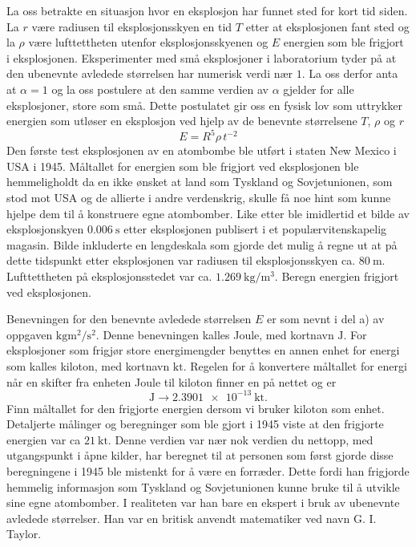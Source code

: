 \documentclass[a4paper,11pt]{article}
\begin{document}
    \begin{subproblem}
        La oss betrakte en situasjon hvor en eksplosjon har funnet sted for
        kort tid siden. La $r$ være radiusen til eksplosjonsskyen en tid $T$
        etter at eksplosjonen fant sted og la $\rho$ være lufttettheten utenfor
        eksplosjonsskyenen og $E$ energien som ble frigjort i eksplosjonen.
        Eksperimenter med små eksplosjoner i laboratorium tyder på at den
        ubenevnte avledede størrelsen har numerisk verdi nær $1$. La oss derfor
        anta at $\alpha=1$ og la oss postulere at den samme verdien av $\alpha$
        gjelder for alle eksplosjoner, store som små. Dette postulatet gir oss
        en fysisk lov som uttrykker energien som utløser en eksplosjon ved hjelp
        av de benevnte størrelsene $T$, $\rho$ og $r$
        \begin{equation*}
          E = R^{5} \rho\,t^{-2}
        \end{equation*}
        Den første test eksplosjonen av en atombombe ble utført i staten New
        Mexico i USA i 1945. Måltallet for energien som ble frigjort ved
        eksplosjonen ble hemmeligholdt da en ikke ønsket at land som Tyskland og
        Sovjetunionen, som stod mot USA og de allierte i andre verdenskrig,
        skulle få noe hint som kunne hjelpe dem til å konstruere egne
        atombomber. Like etter ble imidlertid et bilde av eksplosjonskyen
        $\SI{0.006}{\s}$ etter eksplosjonen publisert i et populærvitenskapelig
        magasin. Bilde inkluderte en lengdeskala som gjorde det mulig å regne ut
        at på dette tidspunkt etter eksplosjonen var radiusen til
        eksplosjonsskyen ca. $\SI{80}{\m}$. Lufttettheten på eksplosjonsstedet
        var ca.  $\SI{1.269}{\kg\per\m\cubed}$. Beregn energien frigjort ved
        eksplosjonen.

        Benevningen for den benevnte avledede størrelsen $E$ er som
        nevnt i del a) av oppgaven $\si{\kg\m\squared\per\s\squared}$. Denne
        benevningen kalles Joule, med kortnavn $\si{\joule}$. For eksplosjoner
        som frigjør store energimengder benyttes en annen enhet for energi som
        kalles kiloton, med kortnavn $\si{\kilo\tonne}$. Regelen for å
        konvertere måltallet for energi når en skifter fra enheten Joule til
        kiloton finner en på nettet og er
        \begin{equation*}
          \si{\joule} \rightarrow \SI{2.3901e-13}{\kilo\tonne}.
        \end{equation*}
        Finn måltallet for den frigjorte energien dersom vi bruker kiloton som
        enhet. Detaljerte målinger og beregninger som ble gjort i 1945 viste at
        den frigjorte energien var ca $\SI{21}{\kilo\tonne}$. Denne verdien var
        nær nok verdien du nettopp, med utgangspunkt i åpne kilder, har beregnet
        til at personen som først gjorde disse beregningene i 1945 ble mistenkt
        for å være en forræder. Dette fordi han frigjorde hemmelig informasjon
        som Tyskland og Sovjetunionen kunne bruke til å utvikle sine egne
        atombomber. I realiteten var han bare en ekspert i bruk av ubenevnte
        avledede størrelser. Han var en britisk anvendt matematiker ved navn G.
        I. Taylor.
    \end{subproblem}
\end{document}
